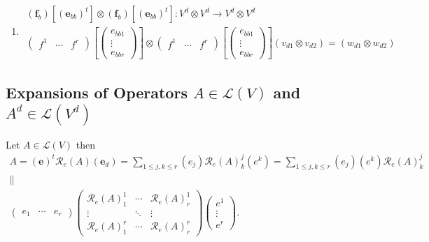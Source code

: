 \documentclass[aps,preprint]{revtex4}
\begin{document}
\begin{enumerate}
\begin{enumerate}
\item 
\begin{gather}
\left( \boldsymbol{f}_{b}\right) \left[ \left( \mathbf{e}_{bb}\right) ^{t}%
\right] \otimes \left( \boldsymbol{f}_{b}\right) \left[ \left( \mathbf{e}%
_{bb}\right) ^{t}\right] :V^{d}\otimes V^{d}\rightarrow V^{d}\otimes V^{d} \\
\left( 
\begin{array}{ccc}
f^{1} & \cdots & f^{r}%
\end{array}%
\right) \left[ \left( 
\begin{array}{c}
e_{bb1} \\ 
\vdots \\ 
e_{bbr}%
\end{array}%
\right) \right] \otimes \left( 
\begin{array}{ccc}
f^{1} & \cdots & f^{r}%
\end{array}%
\right) \left[ \left( 
\begin{array}{c}
e_{bb1} \\ 
\vdots \\ 
e_{bbr}%
\end{array}%
\right) \right] \left( v_{d1}\otimes v_{d2}\right) =\left( w_{d1}\otimes
w_{d2}\right)
\end{gather}
\end{enumerate}
\end{enumerate}

\subsection{Expansions of Operators $A\in \mathcal{L}\left( V\right) $ and $%
A^{d}\in \mathcal{L}\left( V^{d}\right) $}

Let $A\in \mathcal{L}\left( V\right) $ then 
\begin{gather}
A=\left( \boldsymbol{e}\right) ^{t}\mathcal{R}_{e}\left( A\right) \left( 
\boldsymbol{e}_{d}\right) =\sum_{1\leq j,k\leq r}\left( e_{j}\right) 
\mathcal{R}_{e}\left( A\right) _{k}^{j}\left( e^{k}\right) =\sum_{1\leq
j,k\leq r}\left( e_{j}\right) \left( e^{k}\right) \mathcal{R}_{e}\left(
A\right) _{k}^{j} \\
\parallel \\
\left( 
\begin{array}{ccc}
e_{1} & \cdots & e_{r}%
\end{array}%
\right) \left( 
\begin{array}{ccc}
\mathcal{R}_{e}\left( A\right) _{1}^{1} & \cdots & \mathcal{R}_{e}\left(
A\right) _{r}^{1} \\ 
\vdots & \ddots & \vdots \\ 
\mathcal{R}_{e}\left( A\right) _{1}^{r} & \cdots & \mathcal{R}_{e}\left(
A\right) _{r}^{r}%
\end{array}%
\right) \left( 
\begin{array}{c}
e^{1} \\ 
\vdots \\ 
e^{r}%
\end{array}%
\right) .
\end{gather}
\end{document}
